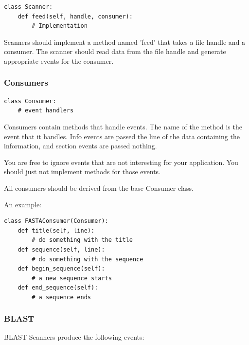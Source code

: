 \documentclass{article}
\begin{document}
\begin{verbatim}
class Scanner:
    def feed(self, handle, consumer):
        # Implementation
\end{verbatim}


Scanners should implement a method named 'feed' that takes a file
handle and a consumer.  The scanner should read data from the file
handle and generate appropriate events for the consumer.

\subsubsection{Consumers}

\begin{verbatim}
class Consumer:
    # event handlers
\end{verbatim}


Consumers contain methods that handle events.  The name of the method
is the event that it handles.  Info events are passed the line of the
data containing the information, and section events are passed
nothing.


You are free to ignore events that are not interesting for your
application.  You should just not implement methods for those events.


All consumers should be derived from the base Consumer class.


An example:


\begin{verbatim}
class FASTAConsumer(Consumer):
    def title(self, line):
        # do something with the title
    def sequence(self, line):
        # do something with the sequence
    def begin_sequence(self):
        # a new sequence starts
    def end_sequence(self):
        # a sequence ends
\end{verbatim}


\subsubsection{BLAST}

BLAST Scanners produce the following events:
\end{document}
